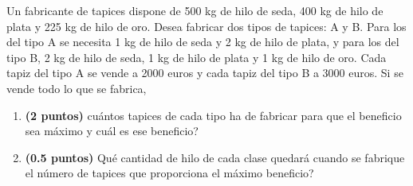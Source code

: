 
Un fabricante de tapices dispone de 500 kg de hilo de seda, 400 kg de hilo de plata y 225 kg de hilo de oro. Desea fabricar dos tipos de tapices: A y B. Para los del tipo A se necesita 1 kg de hilo de seda y 2 kg de hilo de plata, y para los del tipo B, 2 kg de hilo de seda, 1 kg de hilo de plata y 1 kg de hilo de oro. Cada tapiz del tipo A se vende a 2000 euros y cada tapiz del tipo B a 3000 euros. Si se vende todo lo que se fabrica,
\begin{enumerate}[label=\alph*)]
\item \textbf{(2 puntos)} \textquestiondown{}cuántos tapices de cada tipo ha de fabricar para que el beneficio sea máximo y cuál es ese beneficio?
\item \textbf{(0.5 puntos)} \textquestiondown{}Qué cantidad de hilo de cada clase quedará cuando se fabrique el número de tapices que proporciona el máximo beneficio?
\end{enumerate}
